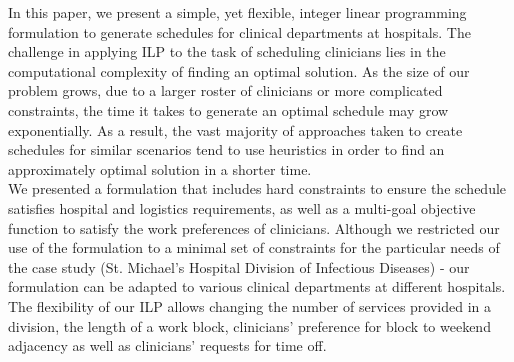 In this paper, we present a simple, yet flexible, integer linear programming formulation to generate schedules for clinical departments at hospitals.
The challenge in applying ILP to the task of scheduling clinicians lies in the computational complexity of finding an optimal solution. As the size of our problem grows, due to a larger roster of clinicians or more complicated constraints, the time it takes to generate an optimal schedule may grow exponentially.
As a result, the vast majority of approaches taken to create schedules for similar scenarios tend to use heuristics in order to find an approximately optimal solution in a shorter time. \\  %


We presented a formulation that includes hard constraints to ensure the schedule satisfies hospital and logistics requirements, as well as a multi-goal objective function to satisfy the work preferences of clinicians.
Although we restricted our use of the formulation to a minimal set of constraints for the particular needs of the case study (St. Michael's Hospital Division of Infectious Diseases) - our formulation can be adapted to various clinical departments at different hospitals. The flexibility of our ILP allows changing the number of services provided in a division, the length of a work block, clinicians' preference for block to weekend adjacency as well as clinicians' requests for time off. \\

